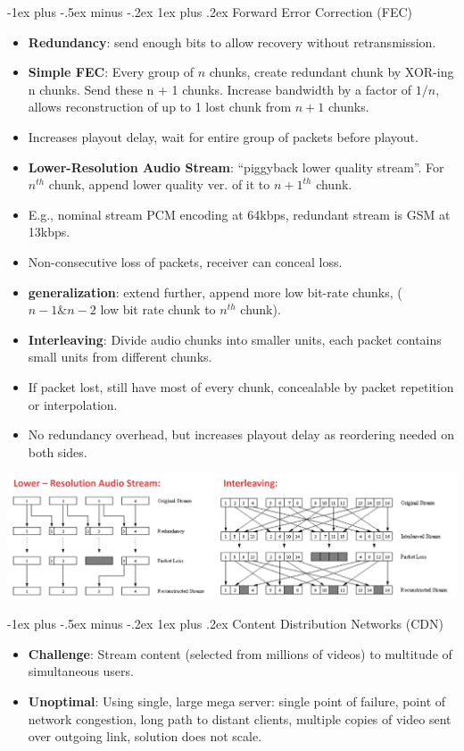 \documentclass[12pt, landscape]{article}
\makeatletter
\renewcommand{\subsubsection}{\@startsection{subsubsection}{3}{0.1mm}%
                                {-1ex plus -.5ex minus -.2ex}%
                                {1ex plus .2ex}%
                                {\normalfont\small\bfseries}}
\makeatother
\begin{document}
\begin{multicols*}{3}
\subsubsection{Forward Error Correction (FEC)}
\begin{itemize}
\item \textbf{Redundancy}: send enough bits to allow recovery without retransmission.
\item \textbf{Simple FEC}: Every group of $n$ chunks, create redundant chunk by XOR-ing n chunks. Send these n + 1 chunks. Increase bandwidth by a factor of $1/n$, allows reconstruction of up to 1 lost chunk from $n+1$ chunks. \
\item Increases playout delay, wait for entire group of packets before playout.
\item \textbf{Lower-Resolution Audio Stream}: ``piggyback lower quality stream''. For $n^{th}$ chunk, append lower quality ver. of it to $n+1^{th}$ chunk. 
\item E.g., nominal stream PCM encoding at 64kbps, redundant stream is GSM at 13kbps. 
\item Non-consecutive loss of packets, receiver can conceal loss.
\item \textbf{generalization}: extend further, append more low bit-rate chunks, ($n-1 \& n-2$ low bit rate chunk to $n^{th}$ chunk).
\item \textbf{Interleaving}: Divide audio chunks into smaller units, each packet contains small units from different chunks.
\item If packet lost, still have most of every chunk, concealable by packet repetition or interpolation. 
\item No redundancy overhead, but increases playout delay as reordering needed on both sides.
\end{itemize}
\medskip
\centerline{\includegraphics[width=1\linewidth]{FEC}}

\subsubsection{Content Distribution Networks (CDN)}
\begin{itemize}
\item \textbf{Challenge}: Stream content (selected from millions of videos) to multitude of simultaneous users.
\item \textbf{Unoptimal}: Using single, large mega server: single point of failure, point of network congestion, long path to distant clients,  multiple copies of video sent over outgoing link, solution does not scale.
\end{itemize}


\end{multicols*}
\end{document}
